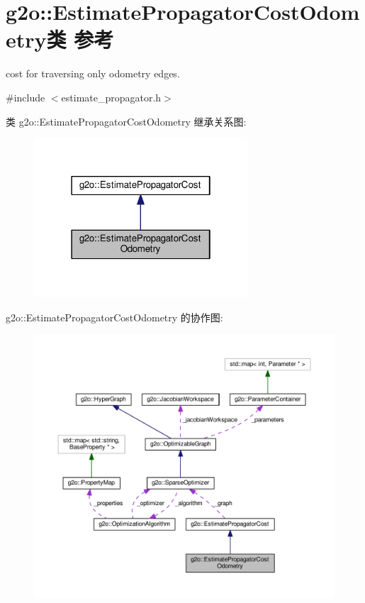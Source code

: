 \hypertarget{classg2o_1_1EstimatePropagatorCostOdometry}{\section{g2o\-:\-:Estimate\-Propagator\-Cost\-Odometry类 参考}
\label{classg2o_1_1EstimatePropagatorCostOdometry}
}


cost for traversing only odometry edges.  




{\ttfamily \#include $<$estimate\-\_\-propagator.\-h$>$}



类 g2o\-:\-:Estimate\-Propagator\-Cost\-Odometry 继承关系图\-:
\nopagebreak
\begin{figure}[H]
\begin{center}
\leavevmode
\includegraphics[width=226pt]{classg2o_1_1EstimatePropagatorCostOdometry__inherit__graph}
\end{center}
\end{figure}


g2o\-:\-:Estimate\-Propagator\-Cost\-Odometry 的协作图\-:
\nopagebreak
\begin{figure}[H]
\begin{center}
\leavevmode
\includegraphics[width=350pt]{classg2o_1_1EstimatePropagatorCostOdometry__coll__graph}
\end{center}
\end{figure}
